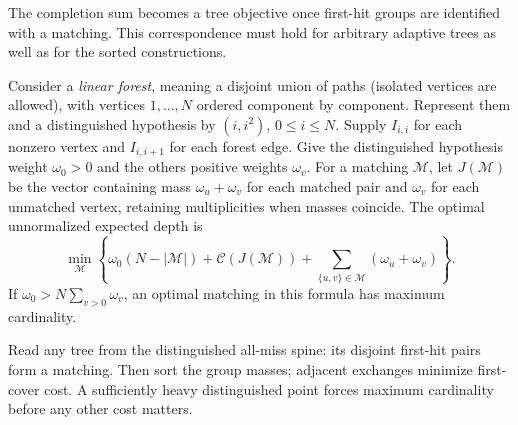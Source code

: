 The completion sum becomes a tree objective once first-hit groups
are identified with a matching. This correspondence must hold for
arbitrary adaptive trees as well as for the sorted constructions.

\begin{lemma}\label{lem:pair-invoice}
Consider a \emph{linear forest}, meaning a disjoint union of paths
(isolated vertices are allowed), with vertices $1,\ldots,N$ ordered
component by component. Represent them and a distinguished hypothesis by
$(i,i^2)$, $0\le i\le N$. Supply $I_{i,i}$ for each nonzero vertex
and $I_{i,i+1}$ for each forest edge.
Give the distinguished hypothesis weight $\omega_0>0$ and the
others positive weights $\omega_v$.
For a matching $\mathcal M$, let $J(\mathcal M)$ be the vector
containing mass
$\omega_u+\omega_v$ for each matched pair and $\omega_v$ for each
unmatched vertex, retaining multiplicities when masses coincide.
The optimal unnormalized expected depth is
\begin{equation}\label{eq:pair-invoice}
 \min_{\mathcal M}
 \left\{\omega_0(N-|\mathcal M|)
       +\mathcal C(J(\mathcal M))
       +\sum_{\{u,v\}\in\mathcal M}(\omega_u+\omega_v)\right\}.
\end{equation}
If $\omega_0>N\sum_{v>0}\omega_v$, an optimal matching in this
formula has maximum cardinality.
\end{lemma}
\begin{proofstrategy}
Read any tree from the distinguished all-miss spine: its disjoint
first-hit pairs form a matching. Then sort the group masses; adjacent
exchanges minimize first-cover cost. A sufficiently heavy distinguished
point forces maximum cardinality before any other cost matters.
\end{proofstrategy}

